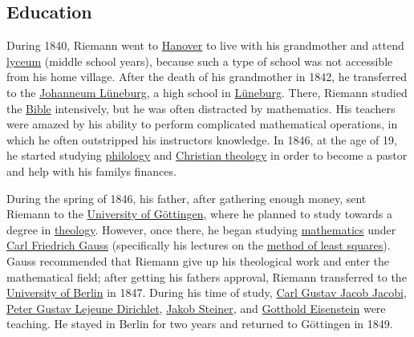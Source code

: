 \subsection{Education}\label{Education}

During 1840, Riemann went to \href{https://en.wikipedia.org/wiki/Hanover}{Hanover} to live with his grandmother and attend \href{https://en.wikipedia.org/wiki/Lyceum}{lyceum} (middle school years), because such a type of school was not accessible from his home village. After the death of his grandmother in 1842, he transferred to the \href{https://de.wikipedia.org/wiki/Johanneum\%20Lüneburg}{Johanneum Lüneburg}, a high school in \href{https://en.wikipedia.org/wiki/Lüneburg}{Lüneburg}. There, Riemann studied the \href{https://en.wikipedia.org/wiki/Bible}{Bible} intensively, but he was often distracted by mathematics. His teachers were amazed by his ability to perform complicated mathematical operations, in which he often outstripped his instructor\textquotesingle s knowledge. In 1846, at the age of 19, he started studying \href{https://en.wikipedia.org/wiki/Philology}{philology} and \href{https://en.wikipedia.org/wiki/Christian_theology}{Christian theology} in order to become a pastor and help with his family\textquotesingle s finances.

During the spring of 1846, his father, after gathering enough money, sent Riemann to the \href{https://en.wikipedia.org/wiki/University_of_Göttingen}{University of Göttingen}, where he planned to study towards a degree in \href{https://en.wikipedia.org/wiki/Theology}{theology}. However, once there, he began studying \href{https://en.wikipedia.org/wiki/Mathematics}{mathematics} under \href{https://en.wikipedia.org/wiki/Carl_Friedrich_Gauss}{Carl Friedrich Gauss} (specifically his lectures on the \href{https://en.wikipedia.org/wiki/Method_of_least_squares}{method of least squares}). Gauss recommended that Riemann give up his theological work and enter the mathematical field; after getting his father\textquotesingle s approval, Riemann transferred to the \href{https://en.wikipedia.org/wiki/University_of_Berlin}{University of Berlin} in 1847. During his time of study, \href{https://en.wikipedia.org/wiki/Carl_Gustav_Jacob_Jacobi}{Carl Gustav Jacob Jacobi}, \href{https://en.wikipedia.org/wiki/Peter_Gustav_Lejeune_Dirichlet}{Peter Gustav Lejeune Dirichlet}, \href{https://en.wikipedia.org/wiki/Jakob_Steiner}{Jakob Steiner}, and \href{https://en.wikipedia.org/wiki/Gotthold_Eisenstein}{Gotthold Eisenstein} were teaching. He stayed in Berlin for two years and returned to Göttingen in 1849.


